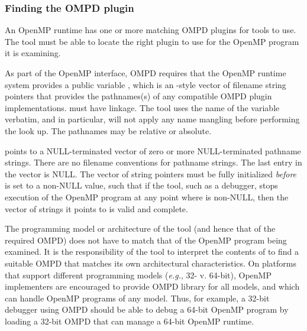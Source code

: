 \subsubsection{Finding the OMPD plugin}
\label{sec:ompd:finding-the-ompd}

An OpenMP runtime has one or more matching OMPD plugins for 
tools to use.
The tool must be able to locate the right plugin to use
for the OpenMP program it is examining.

As part of the OpenMP interface, OMPD requires that the OpenMP
runtime system provides a public variable ,
which is an -style vector of filename string pointers that
provides the pathnames(s) of any compatible OMPD plugin implementations.
 must have  linkage.
The tool uses the name of the variable verbatim,
and in particular, will not apply any name mangling before
performing the look up.
The pathnames may be relative or absolute.

 points to a NULL-terminated
vector of zero or more NULL-terminated pathname strings.
There are no filename conventions for pathname strings.
The last entry in the vector is NULL.
The vector of string pointers must be fully initialized \emph{before}
 is set to a non-NULL value,
such that if the tool, such as a debugger,
stops execution of the OpenMP program at any point where
 is non-NULL,
then the vector of strings it points to is valid and complete.

The programming model or architecture of the tool (and hence
that of the required OMPD) does not have to match that of the OpenMP program
being examined.
It is the responsibility of the tool to interpret the contents
of  to find a suitable OMPD that matches
its own architectural characteristics.
On platforms that support different programming models
(\textit{e.g.}, 32- v. 64-bit), OpenMP implementers are encouraged
to provide OMPD library for all models, and which can handle
OpenMP programs of any model.
Thus, for example, a 32-bit debugger using OMPD should be able
to debug a 64-bit OpenMP program
by loading a 32-bit OMPD that can manage a 64-bit OpenMP runtime.

